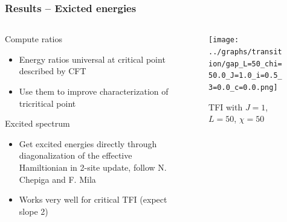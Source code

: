 \documentclass[10pt]{beamer}
\begin{document}
\begin{frame}
    \frametitle{Results -- Exicted energies}

    \begin{columns}
        \begin{column}{0.5\linewidth}
            \begin{block}{Compute ratios}
                \begin{itemize}
                    \item Energy ratios universal at critical point described by CFT
                    \pause
                    \item Use them to improve characterization of tricritical point
                \end{itemize}
            \end{block}

            \pause
            \begin{block}{Excited spectrum}
                \begin{itemize}
                    \item Get excited energies directly through diagonalization of the effective Hamiltionian in 2-site update, follow N. Chepiga and F. Mila \href{https://link.aps.org/doi/10.1103/PhysRevB.96.054425}{}
                    \pause
                    \item Works very well for critical TFI (expect slope 2)
                \end{itemize}
            \end{block}
        \end{column}        

        \begin{column}{0.55\linewidth}
            \begin{figure}
                \texttt{[image: ../graphs/transition/gap\_L=50\_chi=50.0\_J=1.0\_i=0.5\_3=0.0\_c=0.0.png]}
                \caption{TFI with $J=1$, $L=50$, $\chi=50$}
            \end{figure}
        \end{column}
    \end{columns}
\end{frame}
\end{document}
